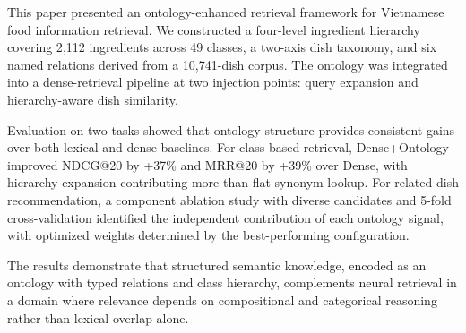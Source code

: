 \label{sec:conclusion}

This paper presented an ontology-enhanced retrieval framework for Vietnamese food information retrieval. We constructed a four-level ingredient hierarchy covering 2{,}112 ingredients across 49 classes, a two-axis dish taxonomy, and six named relations derived from a 10{,}741-dish corpus. The ontology was integrated into a dense-retrieval pipeline at two injection points: query expansion and hierarchy-aware dish similarity.

Evaluation on two tasks showed that ontology structure provides consistent gains over both lexical and dense baselines. For class-based retrieval, Dense+Ontology improved NDCG@20 by +37\% and MRR@20 by +39\% over Dense, with hierarchy expansion contributing more than flat synonym lookup. For related-dish recommendation, a component ablation study with diverse candidates and 5-fold cross-validation identified the independent contribution of each ontology signal, with optimized weights determined by the best-performing configuration.

The results demonstrate that structured semantic knowledge, encoded as an ontology with typed relations and class hierarchy, complements neural retrieval in a domain where relevance depends on compositional and categorical reasoning rather than lexical overlap alone.
